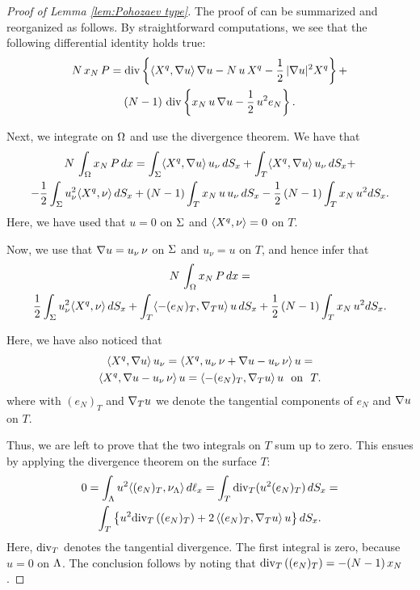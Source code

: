 \documentclass[a4paper,10pt]{amsart}
\numberwithin{equation}{section}
\begin{document}
\begin{proof}[Proof of Lemma \ref{lem:Pohozaev type}]
The proof of \cite[Proposition 3.3]{GX} can be summarized and reorganized as follows.
By straightforward computations, we see that the following differential identity holds true:
\begin{multline*}
N\,x_N\,P=\mathop{\mathrm{div}}\left\{\langle X^q, \nabla u\rangle \,\nabla u-N\,u\,X^q-\frac12\,|\nabla u|^2 X^q\right\}+ \\
(N-1)\,\mathop{\mathrm{div}}\left\{x_N\,u\,\nabla u-\frac12\, u^2 e_N\right\}.
\end{multline*}
\par
Next, we integrate on $\Omega$ and use the divergence theorem. We have that
\begin{multline*}
N\,\int_\Omega x_N\,P\,dx=\int_\Sigma\langle X^q,\nabla u \rangle\,u_\nu\,dS_x+\int_T \langle X^q, \nabla u\rangle\,u_\nu\,dS_x+ \\
-\frac12\int_\Sigma u_\nu^2 \langle X^q, \nu \rangle\,dS_x+ 
(N-1) \int_T x_N\,u\,u_\nu\,dS_x-\frac12\,(N-1) \int_T x_N\,u^2 dS_x.
\end{multline*}
Here, we have used that $u=0$ on $\Sigma$ and $\langle X^q, \nu\rangle=0$ on $T$. 
\par
Now, we use that $\nabla u=u_\nu\,\nu$ on $\Sigma$ and $u_\nu=u$ on $T$, and hence infer that
\begin{multline*}
N\,\int_\Omega x_N\,P\,dx= \\
\frac12 \int_\Sigma u_\nu^2 \langle X^q,\nu \rangle\,dS_x +
\int_T \langle - (e_N)_T, \nabla_T u \rangle\,u\,dS_x+ 
\frac12\,(N-1) \int_T x_N\,u^2 dS_x .
\end{multline*}

Here, we have also noticed that
\begin{multline*}
\lan X^q, \na u\ran\,u_\nu=\lan X^q, u_\nu\,\nu+\na u-u_\nu\,\nu\ran\,u= \\
\lan X^q, \na u-u_\nu\,\nu\ran\,u=  \lan - (e_N)_T, \na_T u\ran\,u \ \mbox{ on } \ T .
\end{multline*}
where with $ (e_N)_T$ and $\nabla_T u$ we denote the tangential components of $e_N$ and $\nabla u$ on $T$.

\par
Thus, we are left to prove that the two integrals on $T$ sum up to zero. 
This ensues by applying the divergence theorem on the surface $T$:
\begin{multline*}
0=\int_\Lambda u^2 \langle  (e_N)_T , \nu_\Lambda\rangle\,d\ell_x=\int_T {\mathop{\mathrm{div}}}_T (u^2  (e_N)_T  )\,dS_x= \\
\int_T \left\{u^2 {\mathop{\mathrm{div}}}_T \left( (e_N)_T  \right) + 2\,\langle (e_N)_T , \nabla_T u\rangle\,u\right\}dS_x.
\end{multline*}
Here, ${\mathop{\mathrm{div}}}_T$ denotes the tangential divergence.
The first integral is zero, because $u=0$ on $\Lambda$.
The conclusion follows by noting that ${\mathop{\mathrm{div}}}_T \left( (e_N)_T \right)= - (N-1)\,x_N$. 
\end{proof}
\end{document}
